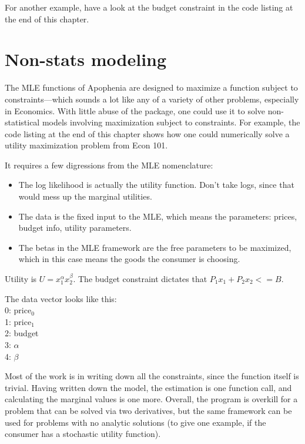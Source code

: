 For another example, have a look at the budget constraint in the code
listing at the end of this chapter.

\section{Non-stats modeling}    \label{econ101}

The MLE functions of Apophenia are designed to maximize a function
subject to constraints---which sounds a lot like any of a variety of
other problems, especially in Economics. With little abuse of the package,
one could use it to solve non-statistical models involving maximization
subject to constraints. For example, the code listing at the end of this
chapter shows how one could numerically solve a utility maximization
problem from Econ 101. 

It requires a few digressions from the MLE nomenclature:
\begin{itemize}
\item The log likelihood is actually the utility function. Don't take logs,
since that would mess up the marginal utilities.

\item The data is the fixed input to the MLE, which means the parameters:
prices, budget info, utility parameters.

\item The betas in the MLE framework are the free parameters to be
maximized, which in this case means the goods the consumer is choosing.
\end{itemize}

Utility is $U = x_1^\alpha x_2^\beta$. 
The budget constraint dictates that $P_1 x_1 + P_2 x_2 <= B$.
                                                             
The data vector looks like this:\\
0:  price$_0$\\
1:  price$_1$\\
2:  budget \\
3:  $\alpha$  \\
4:  $\beta$   
                                                             
Most of the work is in writing down all the constraints, since the
function itself is trivial. Having written down the model, the estimation
is one function call, and calculating the marginal values is one more.
Overall, the program is overkill for a problem that can be solved via
two derivatives, but the same framework can be used for problems with no
analytic solutions (to give one example, if the consumer has a stochastic
utility function).

